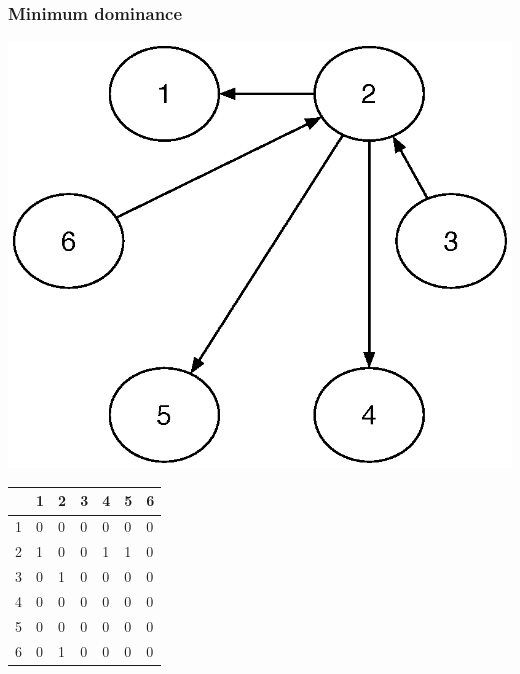 \documentclass[aspectratio=169]{beamer}
\begin{document}
\begin{frame}
\frametitle{Minimum dominance}
\begin{center}
 \includegraphics[scale = 0.35]{pic/dominance3.eps}
\end{center}
 
 \small{
\begin{center}
 \begin{tabular}{l|llllll}
        & 1 & 2 & 3 & 4 & 5 & 6 \\ \hline
        1 & 0 & 0 & 0 & 0 & 0 & 0 \\
        2 & 1 & 0 & 0 & 1 & 1 & 0 \\
        3 & 0 & 1 & 0 & 0 & 0 & 0 \\
        4 & 0 & 0 & 0 & 0 & 0 & 0 \\
        5 & 0 & 0 & 0 & 0 & 0 & 0 \\
        6 & 0 & 1 & 0 & 0 & 0 & 0
    \end{tabular}
\end{center}
    }
\end{frame}
\end{document}
